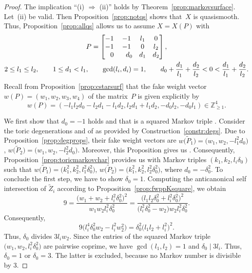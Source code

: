\documentclass[pdftex]{sigma}
\theoremstyle{definition}
\def\ZZ{{\mathbb Z}}
\begin{document}
\begin{proof}
The implication ``(i) $\Rightarrow$ (ii)'' holds
by Theorem~\ref{prop:markovsurface}.
Let~(ii) be valid.
Then Proposition~\ref{prop:notqs} shows
that~$X$ is quasismooth.
Thus, Proposition~\ref{prop:allqs} allows us to
assume $X=X(P)$ with
\begin{gather*}
P
 =
\begin{bmatrix}
-1 & -1 & l_1 & 0
\\
-1 & -1 & 0 & l_2
\\
\hphantom{-} 0 & \hphantom{-}d_0 & d_1 & d_2
\end{bmatrix},
\\
2 \le l_1 \le l_2, \qquad 1 \le d_1 < l_1, \qquad \gcd(l_i,d_i) = 1,
\qquad
d_0 + \frac{d_1}{l_1} + \frac{d_2}{l_2} < 0 < \frac{d_1}{l_1} + \frac{d_2}{l_2}.
\end{gather*}
Recall from Proposition~\ref{prop:cstarsurf}
that the fake weight vector
$w(P)=(w_1,w_2,w_3,w_4)$
of the matrix~$P$ is given explicitly by
\[
w(P)
 =
(-l_1l_2d_0 - l_2d_1 - l_1d_2, l_2d_1 + l_1d_2, -d_0l_2, -d_0l_1)
 \in
\ZZ_{\ge 1}^4.
\]

We first show that $d_0=-1$ holds
and that  is a squared
Markov triple .
Consider the toric degenerations 
and  of  as provided by
Construction~\ref{constr:degs}.
Due to Proposition~\ref{prop:degprops},
their fake weight vectors are
$
w\bigl(\tilde P_1\bigr)
 =
\bigl(w_1, w_2, -l_1^2d_0\bigr)$,
$
w\bigl(\tilde P_2\bigr)
 =
\bigl(w_1, w_2, -l_2^2d_0\bigr)$.
Moreover, this Proposition gives us
.
Consequently, Proposition~\ref{prop:toricmarkovchar}
provides us with Markov triples
$(k_1,k_2,l_i\delta_0)$ such that
$
w\bigl(\tilde P_1\bigr)
 =
\bigl(k_1^2, k_2^2, l_1^2\delta_0^2\bigr)$,
$
w\bigl(\tilde P_2\bigr)
 =
\bigl(k_1^2, k_2^2, l_2^2\delta_0^2\bigr)$,
where $d_0 = - \delta_0^2$. To conclude the first step,
we have to show $\delta_0=1$.
Computing the anticanonical self intersection of $\tilde Z_i$
according to Proposition~\ref{prop:fwppKsquare}, we obtain
\[
9
 =
\frac{\bigl(w_1+w_2+l_i^2\delta_0^2\bigr)^2}{w_1 w_2 l_i^2\delta_0^2}
 =
\frac{\bigl(l_1l_2\delta_0^2+l_i^2\delta_0^2\bigr)^2}{\bigl(l_i^2\delta_0^2-w_2\bigr) w_2 l_i^2\delta_0^2}.
\]
Consequently,
\[
9\bigl(l_i^4\delta_0^2w_2 - l_i^2w_2^2\bigr)
 =
\delta_0^2\bigl(l_1l_2+l_i^2\bigr)^2.
\]
Thus, $\delta_0$ divides $3l_iw_2$.
Since the entries of the squared Markov triple
$\bigl(w_1,w_2,l_i^2\delta_0^2\bigr)$
are pairwise coprime, we have
$\gcd(l_1,l_2) = 1$ and $\delta_0 \mid 3l_i$.
Thus, $\delta_0=1$ or $\delta_0=3$.
The latter is excluded, because no Markov
number is divisible by 3.



\end{proof}
\end{document}
